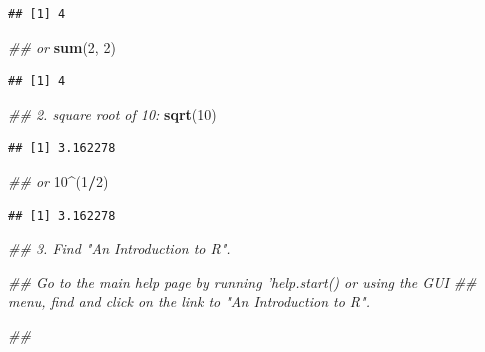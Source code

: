\documentclass[]{book}
\newenvironment{Shaded}{\begin{snugshade}}{\end{snugshade}}
\newcommand{\CommentTok}[1]{\textcolor[rgb]{0.56,0.35,0.01}{\textit{#1}}}
\newcommand{\DecValTok}[1]{\textcolor[rgb]{0.00,0.00,0.81}{#1}}
\newcommand{\KeywordTok}[1]{\textcolor[rgb]{0.13,0.29,0.53}{\textbf{#1}}}
\newcommand{\NormalTok}[1]{#1}
\newcommand{\OperatorTok}[1]{\textcolor[rgb]{0.81,0.36,0.00}{\textbf{#1}}}
\begin{document}
\begin{verbatim}
## [1] 4
\end{verbatim}

\begin{Shaded}
\begin{Highlighting}[]
\CommentTok{## or}
\KeywordTok{sum}\NormalTok{(}\DecValTok{2}\NormalTok{, }\DecValTok{2}\NormalTok{)}
\end{Highlighting}
\end{Shaded}

\begin{verbatim}
## [1] 4
\end{verbatim}

\begin{Shaded}
\begin{Highlighting}[]
\CommentTok{## 2. square root of 10:}
\KeywordTok{sqrt}\NormalTok{(}\DecValTok{10}\NormalTok{)}
\end{Highlighting}
\end{Shaded}

\begin{verbatim}
## [1] 3.162278
\end{verbatim}

\begin{Shaded}
\begin{Highlighting}[]
\CommentTok{## or}
\DecValTok{10}\OperatorTok{^}\NormalTok{(}\DecValTok{1}\OperatorTok{/}\DecValTok{2}\NormalTok{)}
\end{Highlighting}
\end{Shaded}

\begin{verbatim}
## [1] 3.162278
\end{verbatim}

\begin{Shaded}
\begin{Highlighting}[]
\CommentTok{## 3. Find "An Introduction to R".}
\end{Highlighting}
\end{Shaded}

\begin{Shaded}
\begin{Highlighting}[]
\CommentTok{## Go to the main help page by running 'help.start() or using the GUI}
\CommentTok{## menu, find and click on the link to "An Introduction to R".}
\end{Highlighting}
\end{Shaded}

\begin{Shaded}
\begin{Highlighting}[]
\CommentTok{##}
\end{Highlighting}
\end{Shaded}
\end{document}
